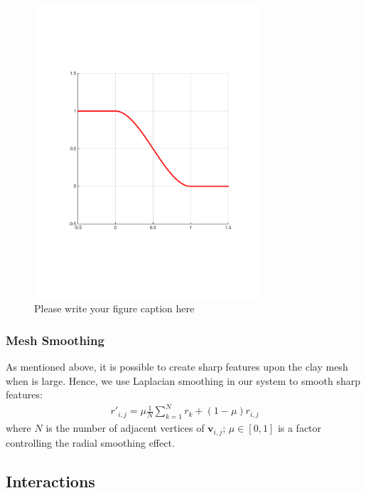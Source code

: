 \begin{figure}
  \includegraphics[width=0.75\textwidth]{f4.pdf}
\caption{Please write your figure caption here}
\label{fig:1}       %
\end{figure}

\subsubsection{Mesh Smoothing}
\label{sec:4.2.4}
As mentioned above, it is possible to create sharp features upon the clay mesh when  is large. Hence, we use Laplacian smoothing in our system to smooth sharp features: 
\begin{equation}
\begin{split}
r'_{i,j} = 
\mu  \frac{1}{N} 
\sum_{k=1}^N r_{k}
+ (1 - \mu)  r_{i,j}
\end{split}
\end{equation}
where $N$ is the number of adjacent vertices of $\mathbf{v}_{i,j}$; $\mu \in [0,1]$ is a factor controlling the radial smoothing effect.

\subsection{Interactions}
\label{sec:4.3}

